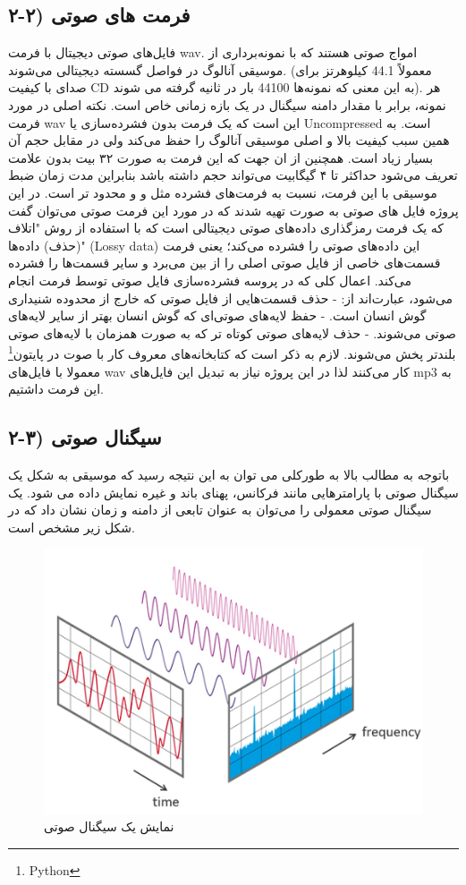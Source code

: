\documentclass{article}
\begin{document}
\subsection{۲-۲) فرمت های صوتی}
فایل‌های صوتی دیجیتال با فرمت wav. امواج صوتی هستند که با نمونه‌برداری از موسیقی آنالوگ در فواصل گسسته دیجیتالی می‌شوند. (معمولاً 44.1 کیلوهرتز برای صدای با کیفیت CD به این معنی که نمونه‌ها 44100 بار در ثانیه گرفته می شوند). هر نمونه، برابر با مقدار دامنه  سیگنال در یک بازه زمانی خاص است. نکته اصلی در مورد فرمت wav این است که یک فرمت بدون فشرده‌سازی یا Uncompressed است. به همین سبب کیفیت بالا و اصلی موسیقی آنالوگ را حفظ می‌کند ولی در مقابل حجم آن بسیار زیاد است. همچنین از ان جهت که این فرمت به صورت ۳۲ بیت بدون علامت تعریف می‌شود حداکثر تا ۴ گیگابیت می‌تواند حجم داشته باشد بنابراین مدت زمان ضبط موسیقی با این فرمت، نسبت به فرمت‌های فشرده مثل   و  و  محدود تر است.\newline
در این پروژه فایل های صوتی به صورت  تهیه شدند که در مورد این فرمت صوتی می‌توان گفت که یک فرمت رمزگذاری داده‌های صوتی دیجیتالی است که با استفاده از روش "اتلاف (حذف) داده‌ها" (Lossy data) این داده‌های صوتی را فشرده می‌کند؛ یعنی فرمت  قسمت‌های خاصی از فایل صوتی اصلی را از بین می‌برد و سایر قسمت‌ها را فشرده می‌کند. اعمال کلی که در پروسه فشرده‌سازی فایل صوتی توسط فرمت  انجام می‌شود، عبارت‌اند از:\newline
- حذف قسمت‌هایی از فایل صوتی که خارج از محدوده شنیداری گوش انسان است.\newline
- حفظ لایه‌های صوتی‌ای که گوش انسان بهتر از سایر لایه‌های صوتی می‌شوند.\newline
- حذف لایه‌های صوتی کوتاه تر که به صورت همزمان با لایه‌های صوتی بلندتر پخش می‌شوند.\newline
لازم به ذکر است که کتابخانه‌های معروف کار با صوت در پایتون\footnote{Python} معمولا با فایل‌های wav کار می‌کنند لذا در این پروژه نیاز به تبدیل این فایل‌های mp3 به این فرمت داشتیم.
\subsection{۲-۳) سیگنال صوتی}
باتوجه به مطالب بالا به طورکلی می توان به این نتیجه رسید که موسیقی به شکل یک سیگنال صوتی با پارامترهایی مانند فرکانس، پهنای باند و غیره نمایش داده می شود. یک سیگنال صوتی معمولی را می‌توان به عنوان تابعی از دامنه و زمان نشان داد که در شکل زیر مشخص است.
\begin{figure}[h]
	\centering
	\includegraphics[width=0.5\linewidth]{Photo/2}
	\caption[نمایش یک سیگنال صوتی]{نمایش یک سیگنال صوتی}
	\label{fig:2}
\end{figure}
\end{document}
